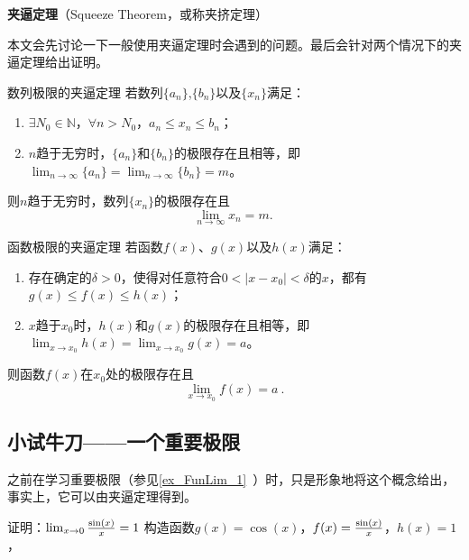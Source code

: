 
\begin{issues}
\issueDraft
\end{issues}
\textbf{夹逼定理}（Squeeze Theorem，或称夹挤定理）

本文会先讨论一下一般使用夹逼定理时会遇到的问题。最后会针对两个情况下的夹逼定理给出证明。



\begin{theorem}{数列极限的夹逼定理}\label{the_SquzTh_1}
若数列$\{a_n\}$,$\{b_n\}$以及$\{x_n\}$满足：
\begin{enumerate}
\item $\exists N_0\in \mathbb{N}$，$\forall n>N_0$，$a_n\leq x_n\leq b_n$；
\item $n$趋于无穷时，$\{a_n\}$和$\{b_n\}$的极限存在且相等，即$\lim_{n\to\infty}\{a_n\}=\lim_{n\to\infty}\{b_n\}=m$。
\end{enumerate}
则$n$趋于无穷时，数列$\{x_n\}$的极限存在且
\begin{equation}
\lim_{n\to\infty}x_n =m.~
\end{equation}
\end{theorem}

\begin{theorem}{函数极限的夹逼定理}\label{the_SquzTh_2}
若函数$f(x)$、$g(x)$以及$h(x)$满足：
\begin{enumerate}
\item 存在确定的$\delta>0$，使得对任意符合$0<|x-x_0|<\delta$的$x$，都有$g(x)\leq f(x)\leq h(x)$；
\item $x$趋于$x_0$时，$h(x)$和$g(x)$的极限存在且相等，即$\lim _{x\to x_0}h(x)=\lim _{x\to x_0}g(x)=a$。
\end{enumerate}
则函数$f(x)$在$x_0$处的极限存在且
\begin{equation}
\lim _{x\to x_0}f(x)=a~.
\end{equation}
\end{theorem}

\subsection{小试牛刀——一个重要极限}

之前在学习重要极限（参见\autoref{ex_FunLim_1}~）时，只是形象地将这个概念给出，事实上，它可以由夹逼定理得到。
\begin{example}{证明：$\lim_{x\to0}{\sin(x)\over x}=1$}
构造函数$g(x)=\cos(x)$，$f(x)={\sin(x)\over x}$，$h(x)=1$，
\end{example}


